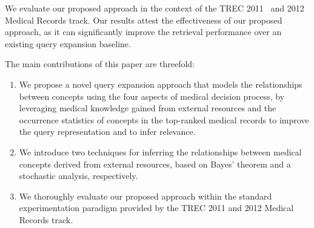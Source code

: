\documentclass[1p]{elsarticle}
\begin{document}
We evaluate our proposed approach in the context of the TREC 2011~\cite{voorhees2011trec} and 2012~\cite{voorhees2012trec} Medical Records track. Our results attest the effectiveness of our proposed approach, as it can significantly improve the retrieval performance over an existing query expansion baseline. 

The main contributions of this paper are threefold:
\begin{enumerate}
\item We propose a novel query expansion approach that models the relationships between concepts using the four aspects of medical decision process, by leveraging medical knowledge gained from external resources and the occurrence statistics of concepts in the top-ranked medical records to improve the query representation and to infer relevance.
\item We introduce two techniques for inferring the relationships between medical concepts derived from external resources, based on Bayes' theorem and a stochastic analysis, respectively.
\item We thoroughly evaluate our proposed approach within the standard experimentation paradigm provided by the TREC 2011 and 2012 Medical Records track. 
\end{enumerate}
\end{document}
